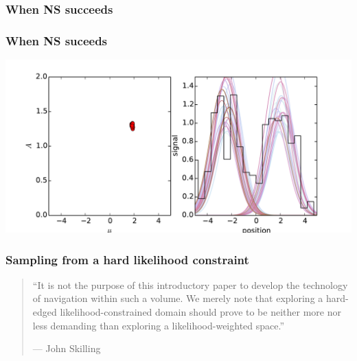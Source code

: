 \documentclass[]{beamer}
\begin{document}
\begin{frame}
  \frametitle{When NS succeeds} 
\end{frame}
\begin{frame}
  \frametitle{When NS suceeds} 
  \includegraphics[width=\textwidth]{movies/NS_multimodal_1.pdf}
\end{frame}


\begin{frame}
  \frametitle{Sampling from a hard likelihood constraint} 

  \pause
  \begin{quote}
    ``It is not the purpose of this introductory paper to develop the technology of navigation within such a volume. We merely note that exploring a hard-edged likelihood-constrained domain should prove to be neither more nor less demanding than exploring a likelihood-weighted space.''
    
   {\hfill --- John Skilling}
  \end{quote}
 
\end{frame}
\end{document}
